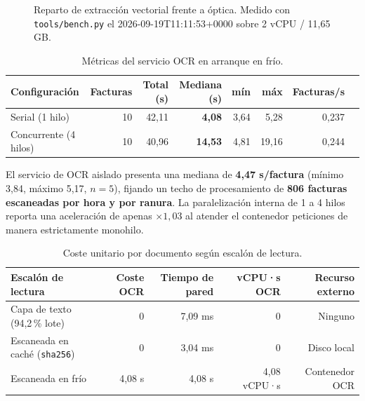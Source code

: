 \documentclass[11pt,a4paper]{article}
\begin{document}
\begin{figure}[htbp]
\centering
{}
\caption{Reparto de extracción vectorial frente a óptica. Medido con \texttt{tools/bench.py} el 2026-09-19T11:11:53+0000 sobre 2 vCPU / 11,65 GB.}
\end{figure}

\begin{table}[htbp]
\centering
\begin{tabular}{lrrrrrrr}
\toprule
\textbf{Configuración} & \textbf{Facturas} & \textbf{Total (s)} & \textbf{Mediana (s)} & \textbf{mín} & \textbf{máx} & \textbf{Facturas/s} \\
\midrule
Serial (1 hilo) & 10 & 42,11 & \textbf{4,08} & 3,64 & 5,28 & 0,237 \\
Concurrente (4 hilos) & 10 & 40,96 & \textbf{14,53} & 4,81 & 19,16 & 0,244 \\
\bottomrule
\end{tabular}
\caption{Métricas del servicio OCR en arranque en frío.}
\end{table}

El servicio de OCR aislado presenta una mediana de \textbf{4,47 s/factura} (mínimo 3,84, máximo 5,17, $n=5$), fijando un techo de procesamiento de \textbf{806 facturas escaneadas por hora y por ranura}. La paralelización interna de 1 a 4 hilos reporta una aceleración de apenas $\times 1,03$ al atender el contenedor peticiones de manera estrictamente monohilo.

\begin{table}[htbp]
\centering
\begin{tabular}{lrrrr}
\toprule
\textbf{Escalón de lectura} & \textbf{Coste OCR} & \textbf{Tiempo de pared} & \textbf{vCPU·s OCR} & \textbf{Recurso externo} \\
\midrule
Capa de texto (94,2\,\% lote) & 0 & 7,09 ms & 0 & Ninguno \\
Escaneada en caché (\texttt{sha256}) & 0 & 3,04 ms & 0 & Disco local \\
Escaneada en frío & 4,08 s & 4,08 s & 4,08 vCPU·s & Contenedor OCR \\
\bottomrule
\end{tabular}
\caption{Coste unitario por documento según escalón de lectura.}
\end{table}
\end{document}
